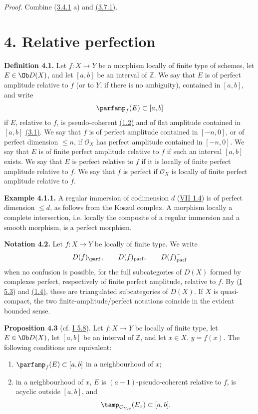 \emph{Proof.} Combine (\hyperlink{sga6.e03.cor.3-4-1}{3.4.1} a) and \hyperlink{sga6.e03.cor.3-7-1}{(3.7.1)}.

\section*{4. Relative perfection}

\textbf{Definition 4.1.} Let \(f:X\to Y\) be a morphism locally of finite type of schemes, let \(E\in\Ob D(X)\), and let \([a,b]\) be an interval of \(\mathbb Z\). We say that \(E\) is of perfect amplitude relative to \(f\) (or to \(Y\), if there is no ambiguity), contained in \([a,b]\), and write
\[
 \parfamp_f(E)\subset[a,b]
\]
if \(E\), relative to \(f\), is pseudo-coherent \hyperlink{sga6.e03.def.1-2}{(1.2)} and of flat amplitude contained in \([a,b]\) \hyperlink{sga6.e03.def.3-1}{(3.1)}. We say that \(f\) is of perfect amplitude contained in \([-n,0]\), or of perfect dimension \(\leq n\), if \(\mathcal O_X\) has perfect amplitude contained in \([-n,0]\). We say that \(E\) is of finite perfect amplitude relative to \(f\) if such an interval \([a,b]\) exists. We say that \(E\) is perfect relative to \(f\) if it is locally of finite perfect amplitude relative to \(f\). We say that \(f\) is perfect if \(\mathcal O_X\) is locally of finite perfect amplitude relative to \(f\).

\textbf{Example 4.1.1.} A regular immersion of codimension \(d\) (\hyperlink{sga6.e07.def.1-4}{VII 1.4}) is of perfect dimension \(\leq d\), as follows from the Koszul complex. A morphism locally a complete intersection, i.e. locally the composite of a regular immersion and a smooth morphism, is a perfect morphism.

\textbf{Notation 4.2.} Let \(f:X\to Y\) be locally of finite type. We write
\[
 D(f)_{\parf},\qquad D(f)_{\mathrm{parf}},\qquad D(f)_{\mathrm{parf}}^{-}
\]
when no confusion is possible, for the full subcategories of \(D(X)\) formed by complexes perfect, respectively of finite perfect amplitude, relative to \(f\). By (\hyperlink{sga6.e01.para.5-3}{I 5.3}) and \hyperlink{sga6.e03.prop.1-4}{(1.4)}, these are triangulated subcategories of \(D(X)\). If \(X\) is quasi-compact, the two finite-amplitude/perfect notations coincide in the evident bounded sense.

\textbf{Proposition 4.3} (cf. \hyperlink{sga6.e01.thm.5-8}{I 5.8}). Let \(f:X\to Y\) be locally of finite type, let \(E\in\Ob D(X)\), let \([a,b]\) be an interval of \(\mathbb Z\), and let \(x\in X\), \(y=f(x)\). The following conditions are equivalent:
\begin{enumerate}[label=\roman*)]
\item \(\parfamp_f(E)\subset[a,b]\) in a neighbourhood of \(x\);
\item in a neighbourhood of \(x\), \(E\) is \((a-1)\)-pseudo-coherent relative to \(f\), is acyclic outside \([a,b]\), and
\[
 \tamp_{\mathcal O_{Y,y}}(E_x)\subset[a,b].
\]
\end{enumerate}

